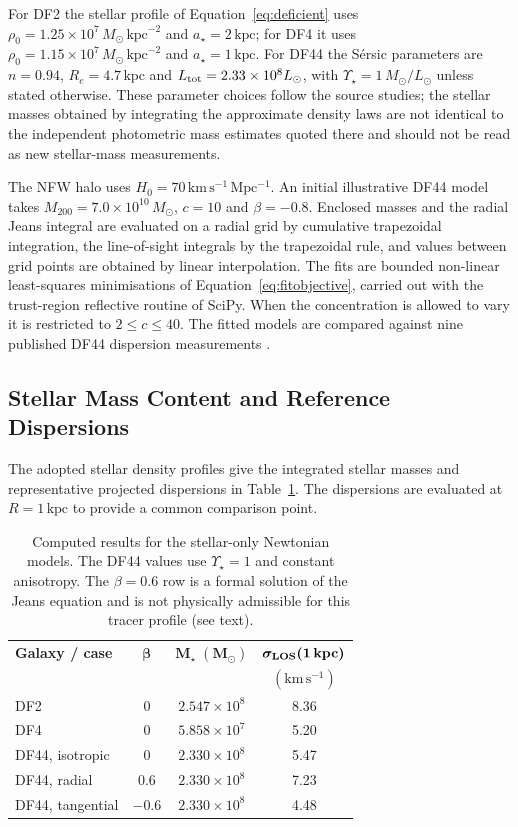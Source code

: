 \documentclass[12pt,a4paper]{report}
\numberwithin{equation}{chapter}
\begin{document}
For DF2 the stellar profile of Equation~\eqref{eq:deficient} uses $\rho_0=1.25\times10^7\,M_\odot\,\mathrm{kpc}^{-2}$ and $a_\star=2\,\mathrm{kpc}$; for DF4 it uses $\rho_0=1.15\times10^7\,M_\odot\,\mathrm{kpc}^{-2}$ and $a_\star=1\,\mathrm{kpc}$. For DF44 the S\'ersic parameters are $n=0.94$, $R_e=4.7\,\mathrm{kpc}$ and $L_{\rm tot}=2.33\times10^8L_\odot$, with $\Upsilon_\star=1\,M_\odot/L_\odot$ unless stated otherwise. These parameter choices follow the source studies; the stellar masses obtained by integrating the approximate density laws are not identical to the independent photometric mass estimates quoted there and should not be read as new stellar-mass measurements.

The NFW halo uses $H_0=70\,\mathrm{km\,s^{-1}\,Mpc^{-1}}$. An initial illustrative DF44 model takes $M_{200}=7.0\times10^{10}\,M_\odot$, $c=10$ and $\beta=-0.8$. Enclosed masses and the radial Jeans integral are evaluated on a radial grid by cumulative trapezoidal integration, the line-of-sight integrals by the trapezoidal rule, and values between grid points are obtained by linear interpolation. The fits are bounded non-linear least-squares minimisations of Equation~\eqref{eq:fitobjective}, carried out with the trust-region reflective routine of SciPy. When the concentration is allowed to vary it is restricted to $2\le c\le40$. The fitted models are compared against nine published DF44 dispersion measurements \cite{vandokkumdf44_2019}.

\subsection*{Stellar Mass Content and Reference Dispersions}

The adopted stellar density profiles give the integrated stellar masses and representative projected dispersions in Table~\ref{tab:stellarresults}. The dispersions are evaluated at $R=1\,\mathrm{kpc}$ to provide a common comparison point.

\begin{table}[htbp]
\centering
\caption{Computed results for the stellar-only Newtonian models. The DF44 values use $\Upsilon_\star=1$ and constant anisotropy. The $\beta=0.6$ row is a formal solution of the Jeans equation and is not physically admissible for this tracer profile (see text).}
\label{tab:stellarresults}
\begin{tabular}{@{}lccc@{}}
\toprule
\textbf{Galaxy / case} & $\boldsymbol{\beta}$ & $\boldsymbol{M_\star\;(M_\odot)}$ & $\boldsymbol{\sigma_{\rm LOS}(1\,\mathrm{kpc})}$ \\
 & & & $(\mathrm{km\,s^{-1}})$\\
\midrule
DF2 & 0 & $2.547\times10^8$ & 8.36 \\
DF4 & 0 & $5.858\times10^7$ & 5.20 \\
DF44, isotropic & 0 & $2.330\times10^8$ & 5.47 \\
DF44, radial & 0.6 & $2.330\times10^8$ & 7.23 \\
DF44, tangential & $-0.6$ & $2.330\times10^8$ & 4.48 \\
\bottomrule
\end{tabular}
\end{table}
\end{document}
